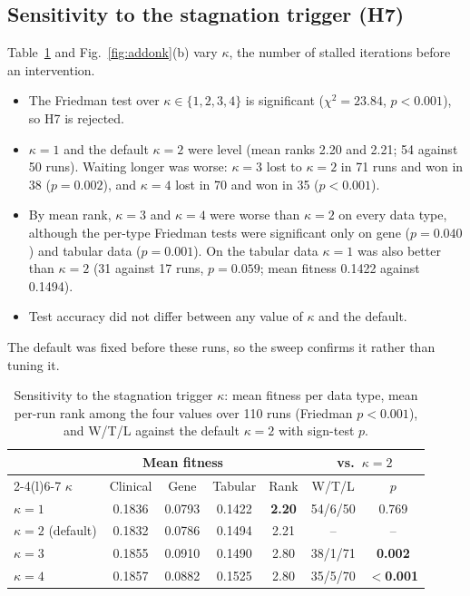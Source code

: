 \documentclass[journal]{IEEEtran}
\begin{document}
\subsection{Sensitivity to the stagnation trigger (H7)}\label{sec:kappa}
Table~\ref{tab:kappa} and Fig.~\ref{fig:addonk}(b) vary $\kappa$, the number of stalled iterations before an intervention.
\begin{itemize}
\item The Friedman test over $\kappa\in\{1,2,3,4\}$ is significant ($\chi^2=23.84$, $p<0.001$), so H7 is rejected.
\item $\kappa=1$ and the default $\kappa=2$ were level (mean ranks 2.20 and 2.21; 54 against 50 runs). Waiting longer was worse: $\kappa=3$ lost to $\kappa=2$ in 71 runs and won in 38 ($p=0.002$), and $\kappa=4$ lost in 70 and won in 35 ($p<0.001$).
\item By mean rank, $\kappa=3$ and $\kappa=4$ were worse than $\kappa=2$ on every data type, although the per-type Friedman tests were significant only on gene ($p=0.040$) and tabular data ($p=0.001$). On the tabular data $\kappa=1$ was also better than $\kappa=2$ (31 against 17 runs, $p=0.059$; mean fitness 0.1422 against 0.1494).
\item Test accuracy did not differ between any value of $\kappa$ and the default.
\end{itemize}
The default was fixed before these runs, so the sweep confirms it rather than tuning it.

\begin{table}[t]
\centering
\caption{Sensitivity to the stagnation trigger $\kappa$: mean fitness per data type, mean per-run rank among the four values over 110 runs (Friedman $p<0.001$), and W/T/L against the default $\kappa=2$ with sign-test $p$.}
\label{tab:kappa}
\footnotesize
\setlength{\tabcolsep}{2.6pt}
\begin{tabular}{@{}lcccccc@{}}
\toprule
& \multicolumn{3}{c}{Mean fitness} & & \multicolumn{2}{c}{vs.\ $\kappa=2$} \\
\cmidrule(lr){2-4}\cmidrule(l){6-7}
$\kappa$ & Clinical & Gene & Tabular & Rank & W/T/L & $p$ \\
\midrule
$\kappa=1$ & 0.1836 & 0.0793 & 0.1422 & \textbf{2.20} & 54/6/50 & 0.769 \\
$\kappa=2$ (default) & 0.1832 & 0.0786 & 0.1494 & 2.21 & -- & -- \\
$\kappa=3$ & 0.1855 & 0.0910 & 0.1490 & 2.80 & 38/1/71 & \textbf{0.002} \\
$\kappa=4$ & 0.1857 & 0.0882 & 0.1525 & 2.80 & 35/5/70 & \textbf{$<$0.001} \\
\bottomrule
\end{tabular}
\end{table}
\end{document}
